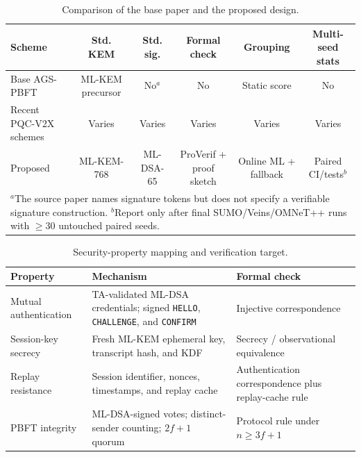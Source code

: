 
\begin{table}[t]
\caption{Comparison of the base paper and the proposed design.}
\label{tab:method-comparison}
\centering
\footnotesize
\setlength{\tabcolsep}{3.4pt}
\begin{tabular}{p{2.35cm}ccccc}
\toprule
\textbf{Scheme} & \textbf{Std. KEM} & \textbf{Std. sig.} & \textbf{Formal check} & \textbf{Grouping} & \textbf{Multi-seed stats} \\
\midrule
Base AGS-PBFT~\cite{aslam2025} & ML-KEM precursor & No$^{a}$ & No & Static score & No \\
Recent PQC-V2X schemes~\cite{rasheed2025,mishra2025,asim2026} & Varies & Varies & Varies & Varies & Varies \\
Proposed & ML-KEM-768 & ML-DSA-65 & ProVerif + proof sketch & Online ML + fallback & Paired CI/tests$^{b}$ \\
\bottomrule
\multicolumn{6}{p{7.2cm}}{\scriptsize $^{a}$The source paper names signature tokens but does not specify a verifiable signature construction. $^{b}$Report only after final SUMO/Veins/OMNeT++ runs with $\geq30$ untouched paired seeds.} \\
\end{tabular}
\end{table}

\begin{table}[t]
\caption{Security-property mapping and verification target.}
\label{tab:security-mapping}
\centering
\footnotesize
\setlength{\tabcolsep}{4.0pt}
\begin{tabular}{p{2.0cm}p{3.0cm}p{2.25cm}}
\toprule
\textbf{Property} & \textbf{Mechanism} & \textbf{Formal check} \\
\midrule
Mutual authentication & TA-validated ML-DSA credentials; signed \texttt{HELLO}, \texttt{CHALLENGE}, and \texttt{CONFIRM} & Injective correspondence \\
Session-key secrecy & Fresh ML-KEM ephemeral key, transcript hash, and KDF & Secrecy / observational equivalence \\
Replay resistance & Session identifier, nonces, timestamps, and replay cache & Authentication correspondence plus replay-cache rule \\
PBFT integrity & ML-DSA-signed votes; distinct-sender counting; $2f+1$ quorum & Protocol rule under $n\geq3f+1$ \\
\bottomrule
\end{tabular}
\end{table}

